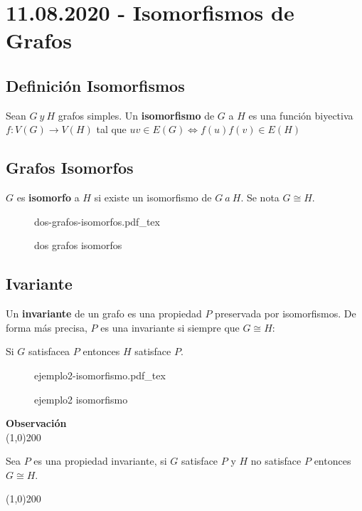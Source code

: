 \documentclass[a4paper]{book}
\newcommand{\incfig}[2][1]{%
    \def\svgwidth{#1\columnwidth}
    {#2.pdf_tex}
}
\newenvironment{obs}
    {
        \begin{flushleft}
       \textbf{Observación}\\
        \line(1,0){200} \\
        \end{flushleft}
    }
    {
        \begin{flushright}
        \line(1,0){200}
        \end{flushright}
    }
\begin{document}
\section{11.08.2020 - Isomorfismos de Grafos}
\label{sec:isomorfismos_de_grafos}

\subsection{Definición Isomorfismos}
\label{ssec:definicion_isomorfismos}

Sean \(G\ y\ H\) grafos simples. Un \textbf{isomorfismo} de \(G\) a \(H\) es
una función biyectiva \(f:V\left(G\right)\to V\left(H\right) \) tal que \(uv\in
E\left(G\right)\iff f\left(u\right) f\left(v\right) \in E\left(H\right) \)

\subsection{Grafos Isomorfos}
\label{ssec:grafos_isomorfos}

\(G\) es \textbf{isomorfo} a \(H\) si existe un isomorfismo de \(G\ a\ H\). Se nota \(G\cong H\).

\begin{figure}[ht]
    \centering
    \incfig{dos-grafos-isomorfos}
    \caption{dos grafos isomorfos}
    \label{fig:dos-grafos-isomorfos}
\end{figure}

\subsection{Ivariante}
\label{ssec:ivariante}

Un \textbf{invariante} de un grafo es una propiedad \(P\) preservada por
isomorfismos. De forma más precisa, \(P\) es una invariante si siempre que
\(G\cong H\):

\begin{center}
    Si \(G\) satisfacea \(P\) entonces \(H\) satisface \(P\).
\end{center}

\begin{figure}[ht]
    \centering
    \incfig[0.5]{ejemplo2-isomorfismo}
    \caption{ejemplo2 isomorfismo}
    \label{fig:ejemplo2-isomorfismo}
\end{figure}

\begin{obs}
    Sea \(P\) es una propiedad invariante, si \(G\) satisface \(P\) y \(H\) no
    satisface \(P\) entonces \(G\cong H\).
\end{obs}
\end{document}
